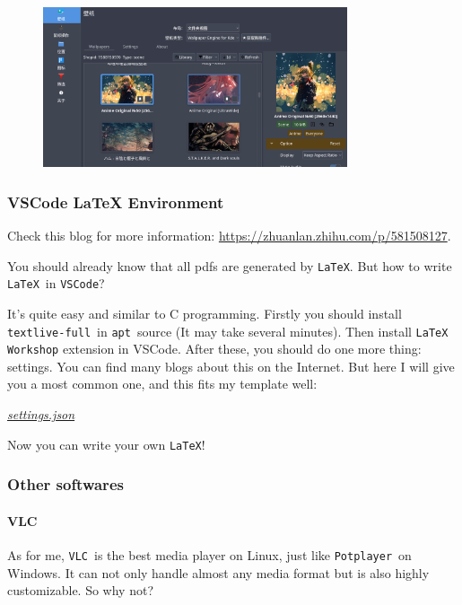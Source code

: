 \documentclass[12pt]{ctexart}
\newenvironment{mdquote}
{%
  \par\noindent
  \begin{list}{}{%
      \setlength{\leftmargin}{1em}%
      \setlength{\rightmargin}{0pt}%
      \setlength{\itemindent}{0pt}%
      \setlength{\listparindent}{\parindent}%
      \setlength{\topsep}{0.5\baselineskip}%
  }
  \item[\textbf{>}\ ]\itshape
}
{\end{list}\par}
\begin{document}
\begin{figure}[H]
    \centering
    \includegraphics[width=0.8\textwidth,keepaspectratio]{assets/Linux/3.2 Decorate your own garden/11.png}
\end{figure}

\subsubsection{\textbf{VSCode LaTeX Environment}}

\begin{mdquote}
Check this blog for more information: \url{https://zhuanlan.zhihu.com/p/581508127}.
\end{mdquote}

You should already know that all pdfs are generated by \texttt{LaTeX}.
But how to write \texttt{LaTeX}\ in \texttt{VSCode}? 

It's quite easy and similar to C programming. Firstly you should install 
\texttt{textlive-full}\ in \texttt{apt}\ source (It may take several minutes). Then install \texttt{LaTeX Workshop}
extension in VSCode. After these, you should do one more thing: settings.
You can find many blogs about this on the Internet. But here I will give you
a most common one, and this fits my template well:

\href{assets/Linux/3.2 Decorate your own garden/settings.json}{\textit{settings.json}}

Now you can write your own \texttt{LaTeX}!

\subsubsection{\textbf{Other softwares}}

\paragraph{\textbf{VLC}}

As for me, \texttt{VLC}\ is the best media player on Linux, just like
\texttt{Potplayer}\ on Windows. It can not only handle almost any media
format but is also highly customizable. So why not?
\end{document}
